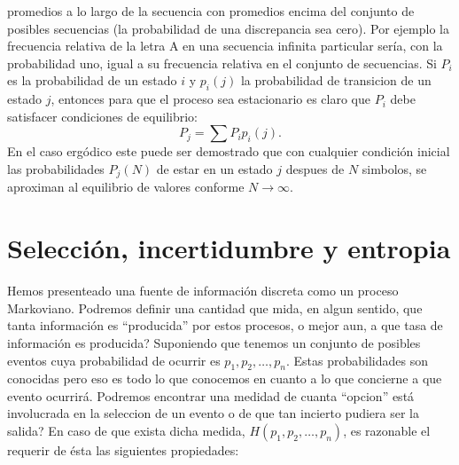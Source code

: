 promedios a lo largo de la secuencia con promedios encima del conjunto
de posibles secuencias (la probabilidad de una discrepancia sea
cero). Por ejemplo la frecuencia relativa de la letra A en una
secuencia infinita particular ser\'{i}a, con la probabilidad uno,
igual a su frecuencia relativa en el conjunto de secuencias.  Si
$P_{i}$ es la probabilidad de un estado $i$ y $p_{i}(j)$ la
probabilidad de transicion de un estado $j$, entonces para que el
proceso sea estacionario es claro que $P_{i}$ debe satisfacer
condiciones de equilibrio:
\begin{equation}
P_{j} = \sum P_{i}p_{i}(j).
\end{equation}
En el caso erg\'{o}dico este puede ser demostrado que con cualquier
condici\'{o}n inicial las probabilidades $P_{j}(N)$ de estar en un
estado $j$ despues de $N$ simbolos, se aproximan al equilibrio de
valores conforme $N \rightarrow \infty$.

\clearpage

\chapter{Selecci\'{o}n, incertidumbre y entropia}
\label{sec:6}

Hemos presenteado una fuente de informaci\'{o}n discreta como un
proceso Markoviano. Podremos definir una cantidad que mida, en algun
sentido, que tanta informaci\'{o}n es ``producida'' por estos
procesos, o mejor aun, a que tasa de informaci\'{o}n es producida?
Suponiendo que tenemos un conjunto de posibles eventos cuya
probabilidad de ocurrir es $p_{1}, p_{2}, \ldots, p_{n}$. Estas
probabilidades son conocidas pero eso es todo lo que conocemos en
cuanto a lo que concierne a que evento
ocurrir\'{a}. {\textquestiondown}Podremos encontrar una medidad de
cuanta ``opcion'' est\'{a} involucrada en la seleccion de un evento o
de que tan incierto pudiera ser la salida?  En caso de que exista
dicha medida, $H(p_{1}, p_{2}, \ldots, p_{n})$, es razonable el
requerir de \'{e}sta las siguientes propiedades:

